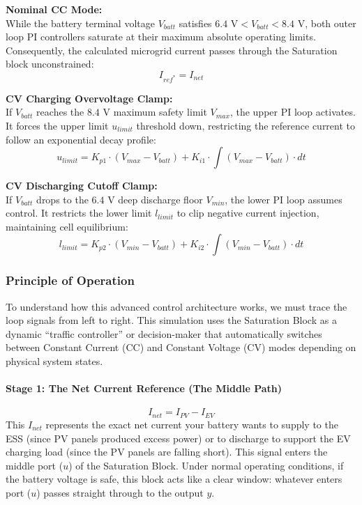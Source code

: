 \vspace{1.5ex}
\noindent\textbf{Nominal CC Mode: }\\
While the battery terminal voltage $V_{batt}$ satisfies $6.4\text{ V} < V_{batt} < 8.4\text{ V}$, both outer loop PI controllers saturate at their maximum absolute operating limits. Consequently, the calculated microgrid current passes through the Saturation block unconstrained:
\begin{equation}
    I_{ref^*} = I_{net}
\end{equation}

\vspace{1.5ex}
\noindent\textbf{CV Charging Overvoltage Clamp:}\\
If $V_{batt}$ reaches the $8.4\text{ V}$ maximum safety limit $V_{max}$, the upper PI loop activates. It forces the upper limit $u_{limit}$ threshold down, restricting the reference current to follow an exponential decay profile:
\begin{equation}
    u_{limit} = K_{p1} \cdot (V_{max} - V_{batt}) + K_{i1} \cdot \int (V_{max} - V_{batt}) \cdot dt
\end{equation}

\vspace{1.5ex}
\noindent\textbf{CV Discharging Cutoff Clamp:}\\
If $V_{batt}$ drops to the $6.4\text{ V}$ deep discharge floor $V_{min}$, the lower PI loop assumes control. It restricts the lower limit $l_{limit}$ to clip negative current injection, maintaining cell equilibrium:
\begin{equation}
    l_{limit} = K_{p2} \cdot (V_{min} - V_{batt}) + K_{i2} \cdot \int (V_{min} - V_{batt}) \cdot dt
\end{equation}

\subsubsection{Principle of Operation}
To understand how this advanced control architecture works, we must trace the loop signals from left to right. This simulation uses the Saturation Block as a dynamic ``traffic controller'' or decision-maker that automatically switches between Constant Current (CC) and Constant Voltage (CV) modes depending on physical system states.

\paragraph{Stage 1: The Net Current Reference (The Middle Path)}
\begin{equation}
   I_{net} = I_{PV} - I_{EV}
\end{equation}
This $I_{net}$ represents the exact net current your battery wants to supply to the ESS (since PV panels produced excess power) or to discharge to support the EV charging load (since the PV panels are falling short). This signal enters the middle port ($u$) of the Saturation Block. Under normal operating conditions, if the battery voltage is safe, this block acts like a clear window: whatever enters port ($u$) passes straight through to the output $y$.

